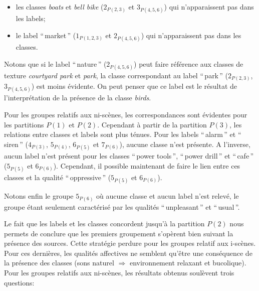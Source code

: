 \begin{itemize}
\item les classes \emph{boats} et \emph{bell bike} ($2_{P(2,3)}$ et $3_{P(4,5,6)}$) qui n’apparaissent pas dans les labels;
\item le label ``\,market\,'' ($1_{P(1,2,3)}$ et $2_{P(4,5,6)}$) qui n’apparaissent pas dans les classes.
\end{itemize} 

Notons que si le label ``\,nature\,'' ($2_{P(4,5,6)}$) peut faire référence aux classes de texture \emph{courtyard park} et \emph{park},  la classe correspondant au label ``\,park\,'' ($2_{P(2,3)}$, $3_{P(4,5,6)}$) est moins évidente. On peut penser que ce label est le résultat de l'interprétation de la présence de la classe \emph{birds}.

Pour les groupes relatifs aux ni-scènes, les correspondances sont évidentes pour les partitions $P(1)$ et $P(2)$. Cependant à partir de la partition $P(3)$, les relations entre classes et labels sont plus ténues. Pour les labels ``\,alarm\,'' et ``\,siren\,'' ($4_{P(3)}$, $5_{P(4)}$, $6_{P(5)}$ et $7_{P(6)}$), aucune classe n'est présente. A l'inverse, aucun label n'est présent  pour les classes ``\,power tools\,'', ``\,power drill\,'' et  ``\,cafe\,'' ($5_{P(5)}$ et $6_{P(6)}$). Cependant, il possible maintenant de faire le lien entre ces classes et la qualité ``\,oppressive\,'' ($5_{P(5)}$ et $6_{P(6)}$).

Notons enfin le groupe $5_{P(6)}$ où aucune classe et aucun label n'est relevé, le groupe étant seulement caractérisé par les qualités ``\,unpleasant\,'' et ``\,usual\,''.

Le fait que les labels et les classes concordent jusqu'à la partition $P(2)$ nous permets de conclure que les premiers groupement s'opèrent bien suivant la présence des sources. Cette stratégie perdure pour les groupes relatif aux i-scènes. Pour ces dernières, les qualités affectives ne semblent qu'être une conséquence de la présence des classes (sons naturel $\Rightarrow$ environnement relaxant et bucolique). Pour les groupes relatifs aux ni-scènes, les résultats obtenus soulèvent trois questions:

